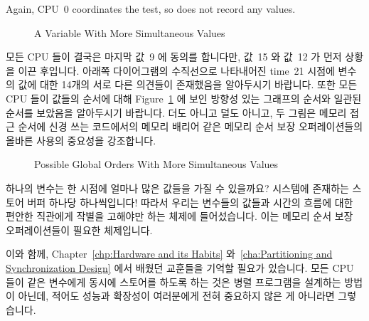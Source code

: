 Again, CPU~0 coordinates the test, so does not record any values.
\fi

\begin{figure}
\centering
{}
\caption{A Variable With More Simultaneous Values}
\end{figure}

모든 CPU 들이 결국은 마지막 값~9 에 동의를 합니다만, 값~15 와 값~12 가 먼저
상황을 이끈 후입니다.
아래쪽 다이어그램의 수직선으로 나타내어진 time~21 시점에 변수의 값에 대한
14개의 서로 다른 의견들이 존재했음을 알아두시기 바랍니다.
또한 모든 CPU 들이 값들의 순서에 대해
Figure~\ref{fig:memorder:Possible Global Orders With More Simultaneous Values}
에 보인 방향성 있는 그래프의 순서와 일관된 순서를 보았음을 알아두시기 바랍니다.
더도 아니고 덜도 아니고, 두 그림은 메모리 접근 순서에 신경 쓰는 코드에서의
메모리 배리어 같은 메모리 순서 보장 오퍼레이션들의 올바른 사용의 중요성을
강조합니다.

\begin{figure}[htb]
\centering
{}
\caption{Possible Global Orders With More Simultaneous Values}
\label{fig:memorder:Possible Global Orders With More Simultaneous Values}
\end{figure}

하나의 변수는 한 시점에 얼마나 많은 값들을 가질 수 있을까요?
시스템에 존재하는 스토어 버퍼 하나당 하나씩입니다!
따라서 우리는 변수들의 값들과 시간의 흐름에 대한 편안한 직관에게 작별을
고해야만 하는 체제에 들어섰습니다.
이는 메모리 순서 보장 오퍼레이션들이 필요한 체제입니다.

이와 함께,
Chapter~\ref{chp:Hardware and its Habits}
와~\ref{cha:Partitioning and Synchronization Design} 에서 배웠던 교훈들을
기억할 필요가 있습니다.
모든 CPU 들이 같은 변수에게 동시에 스토어를 하도록 하는 것은 병렬 프로그램을
설계하는 방법이 아닌데, 적어도 성능과 확장성이 여러분에게 전혀 중요하지 않은 게
아니라면 그렇습니다.

